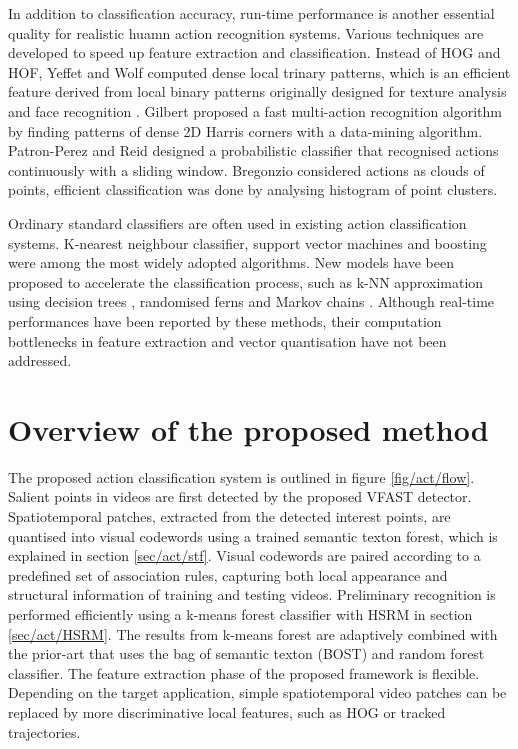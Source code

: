 In addition to classification accuracy, run-time performance is another essential quality for realistic huamn action recognition systems. Various techniques are developed to speed up feature extraction and classification. 
Instead of HOG and HOF, Yeffet and Wolf \cite{Yeffet2009} computed dense local trinary patterns, which is an efficient feature derived from local binary patterns originally designed for texture analysis and face recognition \cite{Ahonen2006}. 
Gilbert \etal \cite{Gilbert2009} proposed a fast multi-action recognition algorithm by finding patterns of dense 2D Harris corners with a data-mining algorithm.
Patron-Perez and Reid \cite{Patron2007} designed a probabilistic classifier that recognised actions continuously with a sliding window. 
Bregonzio \etal \cite{Bregonzio2009} considered actions as clouds of points, efficient classification was done by analysing histogram of point clusters. 

Ordinary standard classifiers are often used in existing action classification systems. 
K-nearest neighbour classifier, support vector machines and boosting were among the most widely adopted algorithms. New models have been proposed to accelerate the classification process, such as k-NN approximation using decision trees \cite{Lin2009}, randomised ferns \cite{Oshin2009} and Markov chains \cite{Messing2009}.   
Although real-time performances have been reported by these methods, their computation bottlenecks in feature extraction and vector quantisation have not been addressed. 

\section{Overview of the proposed method} 
\label{sec/act/overview}

The proposed action classification system is outlined in figure \ref{fig/act/flow}. 
Salient points in videos are first detected by the proposed VFAST detector. 
Spatiotemporal patches, extracted from the detected interest points, are quantised into visual codewords using a trained semantic texton forest, which is explained in section \ref{sec/act/stf}. 
Visual codewords are paired according to a predefined set of association rules, capturing both local appearance and structural information of training and testing videos.  
Preliminary recognition is performed efficiently using a k-means forest classifier with HSRM in section \ref{sec/act/HSRM}. 
The results from k-means forest are adaptively combined with the prior-art that uses the bag of semantic texton (BOST) and random forest classifier.
The feature extraction phase of the proposed framework is flexible. 
Depending on the target application, simple spatiotemporal video patches can be replaced by more discriminative local features, such as HOG or tracked trajectories.

